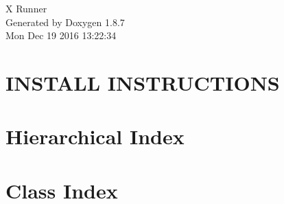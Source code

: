 \documentclass[twoside]{book}
\newcommand{\+}{\discretionary{\mbox{\scriptsize$\hookleftarrow$}}{}{}}
\newcommand{\clearemptydoublepage}{%
  \newpage{\pagestyle{empty}\cleardoublepage}%
}
\begin{document}
\hypersetup{pageanchor=false,
             bookmarks=true,
             bookmarksnumbered=true,
             pdfencoding=unicode
            }
\begin{titlepage}
\vspace*{7cm}
\begin{center}%
{\Large X Runner }\\
\vspace*{1cm}
{\large Generated by Doxygen 1.8.7}\\
\vspace*{0.5cm}
{\small Mon Dec 19 2016 13:22:34}\\
\end{center}
\end{titlepage}
\clearemptydoublepage
\tableofcontents
\clearemptydoublepage
{}
\hypersetup{pageanchor=true}

\chapter{I\+N\+S\+T\+A\+L\+L I\+N\+S\+T\+R\+U\+C\+T\+I\+O\+N\+S}
\label{md_README}
\hypertarget{md_README}{}

\chapter{Hierarchical Index}

\chapter{Class Index}

\end{document}
